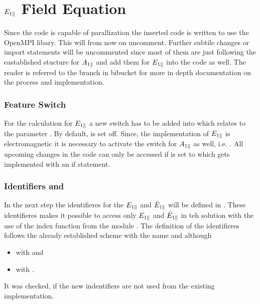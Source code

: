 \section{$E_{1\parallel}$ Field Equation}
\label{sec:implementationFieldEpar}

Since the code is capable of parallization the inserted code is written to use the OpenMPI libary. This will from now on uncomment. Further subtile changes or import statements will be uncommented since most of them are just following the eastablished stucture for $A_{1\parallel}$ and add them for $E_{1\parallel}$ into the code as well. The reader is referred to the branch in bibucket\cite{FeatureEparBitbucket} for more in depth documentation on the process and implementation.

\subsubsection*{Feature Switch}

For the calculation for $E_{1\parallel}$ a new switch has to be added into  which relates to the parameter . By default,  is set off. Since, the implementation of $E_{1\parallel}$ is electromagnetic it is necessary to activate the switch for $A_{1\parallel}$ as well, i.e. . All upcoming changes in the code can only be accessed if  is set to  which gets implemented with an if statement.

\subsubsection*{Identifiers  and }

In the next step the identifieres for the $E_{1\parallel}$ and $\bar{E}_{1\parallel}$ will be defined in . These identifieres makes it possible to access only $E_{1\parallel}$ and $\bar{E}_{1\parallel}$ in teh solution  with the use of the index function from the module . The definition of the identifieres follows the already established scheme with the name  and  although 
\begin{itemize}
    \item {} with  and
    \item {} with .
\end{itemize}
It was checked, if the new indentifiers are not used from the existing implementation. \bigskip

